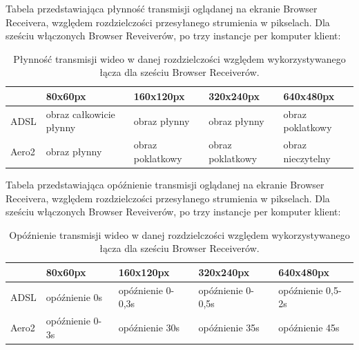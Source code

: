 Tabela przedstawiająca płynność transmisji oglądanej na ekranie Browser Receivera, względem rozdzielczości przesyłanego strumienia w pikselach. Dla sześciu włączonych Browser Reveiverów, po trzy instancje per komputer klient:
\begin{table}[h]
    \centering
    \begin{tabular}{|l|l|l|l|l|}
        \hline
        & 80x60px & 160x120px & 320x240px & 640x480px \\
        \hline
        ADSL
        &
        obraz całkowicie płynny 
        &
        obraz płynny
        &
        obraz płynny
        &
        obraz poklatkowy
        \\
        \hline
        Aero2
        &
        obraz płynny
        &
        obraz poklatkowy
        &
        obraz poklatkowy
        &
        obraz nieczytelny
        \\
        \hline
    \end{tabular}
    \caption{Płynność transmisji wideo w danej rozdzielczości względem wykorzystywanego łącza dla sześciu Browser Receiverów.}
\end{table}

Tabela przedstawiająca opóźnienie transmisji oglądanej na ekranie Browser Receivera, względem rozdzielczości przesyłanego strumienia w pikselach. Dla sześciu włączonych Browser Reveiverów, po trzy instancje per komputer klient:
\begin{table}[h]
    \centering
    \begin{tabular}{|l|l|l|l|l|}
        \hline
        & 80x60px & 160x120px & 320x240px & 640x480px \\
        \hline
        ADSL
        &
        opóźnienie 0s
        &
        opóźnienie 0-0,3s
        &
        opóźnienie 0-0,5s
        &
        opóźnienie 0,5-2s \\
        \hline
        Aero2
        &
        opóźnienie 0-3s
        &
        opóźnienie 30s
        &
        opóźnienie 35s
        &
        opóźnienie 45s \\
        \hline
    \end{tabular}
    \caption{Opóźnienie transmisji wideo w danej rozdzielczości względem wykorzystywanego łącza dla sześciu Browser Receiverów.}
\end{table}

\newpage
